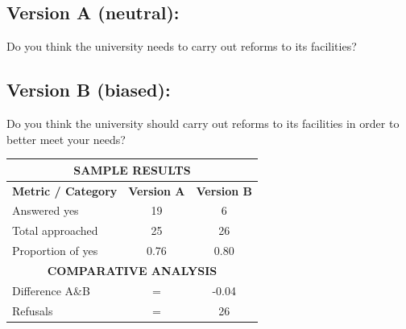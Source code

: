 \documentclass[12pt]{article}
\begin{document}
    \subsection{Version A (neutral):}
    
    Do you think the university needs to carry out reforms to its facilities?
    
    \subsection{Version B (biased):}
    
    Do you think the university should carry out reforms to its facilities in order to better meet your needs?
    
    \vspace*{1.0 cm}
    
    \begin{center}
    
        \begin{tabular}{l cc} 
            \toprule
            
            \multicolumn{3}{c}{\textbf{SAMPLE RESULTS}} \\
                \midrule            
                \textbf{Metric / Category} & \textbf{Version A} & \textbf{Version B} \\
                    \midrule
                        Answered yes                 & 19                & 6                 \\
                        Total approached              & 25                & 26                \\
                        Proportion of yes             & 0.76              & 0.80              \\
                    \toprule
                    
            \multicolumn{3}{c}{\textbf{COMPARATIVE ANALYSIS}} \\
                \midrule
                    Difference A\&B               &          =         &     -0.04           \\
                    Refusals                     &          =         &       26            \\
                 \bottomrule             
        \end{tabular}
    
    \end{center}

\begin{center}
\vfill
\thepage
\end{center}
\newpage
\end{document}
